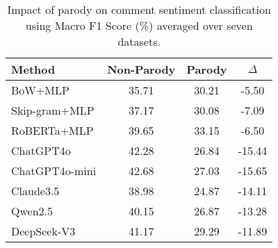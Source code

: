 \begin{table}[h]
\small
\centering
\begin{tabular}{lccc}
\toprule
\textbf{Method} & \textbf{Non-Parody} & \textbf{Parody} & \textbf{$\Delta$} \\ 
\midrule
BoW+MLP & 35.71 & 30.21 & \textcolor{decrease}{-5.50} \\
Skip-gram+MLP & 37.17 & 30.08 & \textcolor{decrease}{-7.09} \\
RoBERTa+MLP & 39.65 & 33.15 & \textcolor{decrease}{-6.50} \\
ChatGPT4o & 42.28 & 26.84 & \textcolor{decrease}{-15.44} \\
ChatGPT4o-mini & 42.68 & 27.03 & \textcolor{decrease}{-15.65} \\
Claude3.5 & 38.98 & 24.87 & \textcolor{decrease}{-14.11} \\
Qwen2.5 & 40.15 & 26.87 & \textcolor{decrease}{-13.28} \\
DeepSeek-V3 & 41.17 & 29.29 & \textcolor{decrease}{-11.89} \\
\bottomrule
\end{tabular}
\caption{Impact of parody on comment sentiment classification using Macro F1 Score (\%) averaged over seven datasets.}\vspace{-0.4cm}
\label{tab:impact_parody_senti}
\end{table}